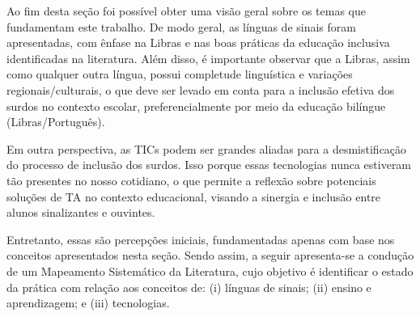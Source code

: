 Ao fim desta seção foi possível obter uma visão geral sobre os temas que fundamentam este trabalho. De modo geral, as línguas de sinais foram apresentadas, com ênfase na Libras e nas boas práticas da educação inclusiva identificadas na literatura. Além disso, é importante observar que a Libras, assim como qualquer outra língua, possui completude linguística e variações regionais/culturais, o que deve ser levado em conta para a inclusão efetiva dos surdos no contexto escolar, preferencialmente por meio da educação bilíngue (Libras/Português).

Em outra perspectiva, as TICs podem ser grandes aliadas para a desmistificação do processo de inclusão dos surdos. Isso porque essas tecnologias nunca estiveram tão presentes no nosso cotidiano, o que permite a reflexão sobre potenciais soluções de TA no contexto educacional, visando a sinergia e inclusão entre alunos sinalizantes e ouvintes.

Entretanto, essas são percepções iniciais, fundamentadas apenas com base nos conceitos apresentados nesta seção. Sendo assim, a seguir apresenta-se a condução de um Mapeamento Sistemático da Literatura, cujo objetivo é identificar o estado da prática com relação aos conceitos de: (i) línguas de sinais; (ii) ensino e aprendizagem; e (iii) tecnologias. %
